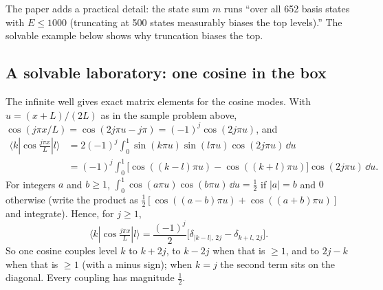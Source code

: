 The paper adds a practical detail: the state sum $m$ runs ``over all 652 basis states with $E\le1000$ (truncating at 500 states measurably biases the top levels).'' The solvable example below shows why truncation biases the top.

\subsection{A solvable laboratory: one cosine in the box}

The infinite well gives exact matrix elements for the cosine modes. With $u=(x+L)/(2L)$ as in the sample problem above, $\cos(j\pi x/L)=\cos(2j\pi u-j\pi)=(-1)^j\cos(2j\pi u)$, and
\begin{align}
\langle k|\cos\tfrac{j\pi x}{L}|l\rangle
&=2(-1)^j\int_0^1\sin(k\pi u)\sin(l\pi u)\cos(2j\pi u)\,\dd u\nonumber\\
&=(-1)^j\int_0^1\big[\cos((k-l)\pi u)-\cos((k+l)\pi u)\big]\cos(2j\pi u)\,\dd u .\nonumber
\end{align}
For integers $a$ and $b\ge1$, $\int_0^1\cos(a\pi u)\cos(b\pi u)\,\dd u=\tfrac12$ if $|a|=b$ and $0$ otherwise (write the product as $\tfrac12[\cos((a-b)\pi u)+\cos((a+b)\pi u)]$ and integrate). Hence, for $j\ge1$,
\begin{equation}
\langle k|\cos\tfrac{j\pi x}{L}|l\rangle=\frac{(-1)^j}{2}\Big[\delta_{|k-l|,\,2j}-\delta_{k+l,\,2j}\Big].\label{eq:paper-spurious-floor-boxcos}
\end{equation}
So one cosine couples level $k$ to $k+2j$, to $k-2j$ when that is $\ge1$, and to $2j-k$ when that is $\ge1$ (with a minus sign); when $k=j$ the second term sits on the diagonal. Every coupling has magnitude $\tfrac12$.

